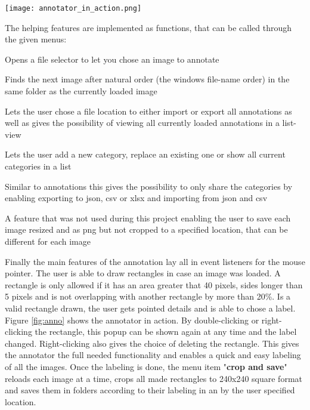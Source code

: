 \begin{figure*}[t]
    \centering
    \texttt{[image: annotator\_in\_action.png]}
    \caption{image annotator in action}
    \label{fig:anno}
\end{figure*}

The helping features are implemented as functions, that can be called through
the given menus:

\begin{description}[font=\sffamily\bfseries, leftmargin=1cm, style=nextline]
    \item[open image]
        Opens a file selector to let you chose an image to annotate
    \item[load next image]
        Finds the next image after natural order (the windows file-name order) in
        the same folder as the currently loaded image
    \item[save/import/view annotations]
        Lets the user chose a file location to either import or export all
        annotations as well as gives the possibility of viewing all currently
        loaded annotations in a list-view
    \item[add/replace/show category]
         Lets the user add a new category, replace an existing one or show all
         current categories in a list
    \item[import/export categories]
        Similar to annotations this gives the possibility to only share the
        categories by enabling exporting to json, csv or xlsx and importing from
        json and csv
    \item[replace/change destination]
        A feature that was not used during this project enabling the user to
        save each image resized and as png but not cropped to a specified
        location, that can be different for each image
\end{description}

Finally the main features of the annotation lay all in event listeners for the
mouse pointer. The user is able to draw rectangles in case an image was loaded.
A rectangle is only allowed if it has an area greater that 40 pixels, sides
longer than 5 pixels and is not overlapping with another rectangle by more than
20\%. Is a valid rectangle drawn, the user gets pointed details and is able to
chose a label. Figure \ref{fig:anno} shows the annotator in action. By
double-clicking or right-clicking the rectangle, this popup can be shown again
at any time and the label changed. Right-clicking also gives the choice of
deleting the rectangle.
\newline
This gives the annotator the full needed functionality and enables a quick and
easy labeling of all the images. Once the labeling is done, the menu item
"\textbf{crop and save}" reloads each image at a time, crops all made rectangles
to 240x240 square format and saves them in folders according to their labeling
in an by the user specified location.

